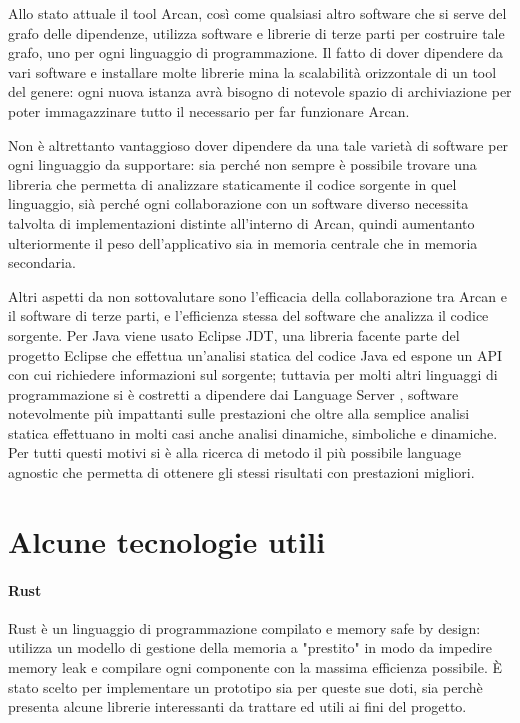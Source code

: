 Allo stato attuale il tool Arcan, cos\`i come qualsiasi altro software che si serve del grafo delle dipendenze, utilizza software e librerie di terze parti per costruire tale grafo, uno per ogni linguaggio di programmazione. Il fatto di dover dipendere da vari software e installare molte librerie mina la scalabilit\`a orizzontale di un tool del genere: ogni nuova istanza avr\`a bisogno di notevole spazio di archiviazione per poter immagazzinare tutto il necessario per far funzionare Arcan.

Non \`e altrettanto vantaggioso dover dipendere da una tale variet\`a di software per ogni linguaggio da supportare: sia perch\'e non sempre \`e possibile trovare una libreria che permetta di analizzare staticamente il codice sorgente in quel linguaggio, si\`a perch\'e ogni collaborazione con un software diverso necessita talvolta di implementazioni distinte all'interno di Arcan, quindi aumentanto ulteriormente il peso dell'applicativo sia in memoria centrale che in memoria secondaria.

Altri aspetti da non sottovalutare sono l'efficacia della collaborazione tra Arcan e il software di terze parti, e l'efficienza stessa del software che analizza il codice sorgente. Per Java viene usato Eclipse JDT, una libreria facente parte del progetto Eclipse che effettua un'analisi statica del codice Java ed espone un API con cui richiedere informazioni sul sorgente; tuttavia per molti altri linguaggi di programmazione si \`e costretti a dipendere dai Language Server \cite{LanguageServer}, software notevolmente pi\`u impattanti sulle prestazioni che oltre alla semplice analisi statica effettuano in molti casi anche analisi dinamiche, simboliche e dinamiche. Per tutti questi motivi si \`e alla ricerca di metodo il pi\`u possibile language agnostic che permetta di ottenere gli stessi risultati con prestazioni migliori.

\section{Alcune tecnologie utili}

\paragraph{Rust}

Rust \cite{blandy2017programming} \`e un linguaggio di programmazione compilato e memory safe by design: utilizza un modello di gestione della memoria a "prestito" in modo da impedire memory leak e compilare ogni componente con la massima efficienza possibile. \`E stato scelto per implementare un prototipo sia per queste sue doti, sia perch\`e presenta alcune librerie interessanti da trattare ed utili ai fini del progetto.

